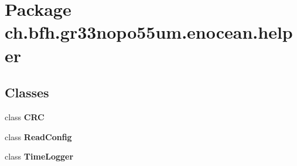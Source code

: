\section{Package ch.\+bfh.\+gr33nopo55um.\+enocean.\+helper}
\label{namespacech_1_1bfh_1_1gr33nopo55um_1_1enocean_1_1helper}
\subsection*{Classes}
\begin{DoxyCompactItemize}
\item 
class {\bf C\+RC}
\item 
class {\bf Read\+Config}
\item 
class {\bf Time\+Logger}
\end{DoxyCompactItemize}
